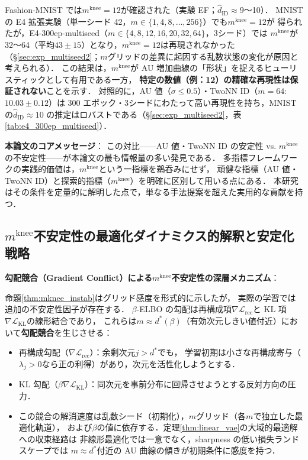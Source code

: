 \documentclass[11pt,a4paper]{jsarticle}
\newcommand{\mknee}{m^{\mathrm{knee}}}
\begin{document}
Fashion-MNIST では$\mknee = 12$が確認された（実験 EF；$\hat{d}_\mathrm{ID} \approx 9$〜10）．
MNIST の E4 拡張実験（単一シード 42，$m \in \{1, 4, 8, \ldots, 256\}$）でも$\mknee = 12$が
得られたが，E4-300ep-multiseed（$m \in \{4, 8, 12, 16, 20, 32, 64\}$，3シード）では
$\mknee$が 32〜64（平均$43 \pm 15$）となり，$\mknee = 12$は再現されなかった
（§\ref{sec:exp_multiseed2}；$m$グリッドの差異に起因する乱数状態の変化が原因と考えられる）．
この結果は，$\mknee$が AU 増加曲線の「形状」を捉えるヒューリスティックとして有用である一方，
\textbf{特定の数値（例：12）の精確な再現性は保証されない}ことを示す．
対照的に，AU 値（$\sigma \leq 0.5$）・TwoNN ID（$m=64$: $10.03 \pm 0.12$）は
300 エポック・3シードにわたって高い再現性を持ち，MNIST の$\hat{d}_\mathrm{ID} \approx 10$
の推定はロバストである（§\ref{sec:exp_multiseed2}，表\ref{tab:e4_300ep_multiseed}）．

\textbf{本論文のコアメッセージ}：
この対比——AU 値・TwoNN ID の安定性 vs. $\mknee$の不安定性——が本論文の最も情報量の多い発見である．
多指標フレームワークの実践的価値は，$\mknee$という一指標を鵜呑みにせず，
頑健な指標（AU 値・TwoNN ID）と探索的指標（$\mknee$）を明確に区別して用いる点にある．
本研究はその条件を定量的に解明した点で，単なる手法提案を超えた実用的な貢献を持つ．

\subsection{$\mknee$不安定性の最適化ダイナミクス的解釈と安定化戦略}\label{sec:disc_mknee_improve}

\textbf{勾配競合（Gradient Conflict）による$\mknee$不安定性の深層メカニズム}：

命題\ref{thm:mknee_instab}はグリッド感度を形式的に示したが，
実際の学習では追加の不安定性因子が存在する．
$\beta$-ELBO の勾配は再構成項$\nabla\mathcal{L}_\mathrm{rec}$と
KL 項$\nabla\mathcal{L}_\mathrm{KL}$の線形結合であり，
これらは$m \approx d^*(\beta)$（有効次元しきい値付近）において\textbf{勾配競合}を生じさせる：

\begin{itemize}
  \item 再構成勾配（$\nabla\mathcal{L}_\mathrm{rec}$）：余剰次元$j > d^*$でも，
        学習初期は小さな再構成寄与（$\lambda_j > 0$なら正の利得）があり，次元を活性化しようとする．
  \item KL 勾配（$\beta\nabla\mathcal{L}_\mathrm{KL}$）：同次元を事前分布に回帰させようとする反対方向の圧力．
  \item この競合の解消速度は乱数シード（初期化），$m$グリッド（各$m$で独立した最適化軌道），
        および$\beta$の値に依存する．定理\ref{thm:linear_vae}の大域的最適解への収束経路は
        非線形最適化では一意でなく，sharpness の低い損失ランドスケープでは
        $m \approx d^*$付近の AU 曲線の傾きが初期条件に感度を持つ．
\end{itemize}
\end{document}
